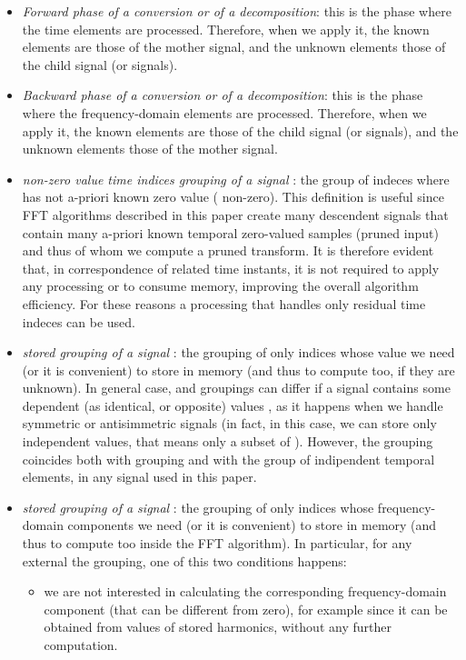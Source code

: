 \documentclass[a4paper,10pt]{article}
\begin{document}
\begin{itemize}
\item
\emph{Forward phase of a conversion or of a decomposition}:
this is the phase where the time elements are processed. Therefore, when we apply it, the known elements are those of the mother signal, and the unknown elements those of the child signal (or signals).


\item
\emph{Backward phase of a conversion or of a decomposition}:
this is the phase where the frequency-domain elements are processed. Therefore, when we apply it, the known elements are those of the child signal (or signals), and the unknown elements those of the mother signal.


\item
\emph{non-zero value time indices grouping  of a signal }:
the group of  indeces where  has not a-priori known zero value ( non-zero).
This definition is useful since FFT algorithms described in this paper create many descendent signals that contain many a-priori known temporal zero-valued samples (pruned input) and thus of whom we compute a pruned transform.
It is therefore evident that, in correspondence of related time instants, it is not required to apply any processing or to consume memory, improving the overall algorithm efficiency. 
For these reasons a processing that handles only residual time indeces can be used.


\item
\emph{stored  grouping of a signal }:
the grouping of only indices  whose  value we need (or it is convenient) to store in memory (and thus to compute too, if they are unknown).
In general case,  and  groupings can differ if a signal contains some dependent (as identical, or opposite) values , as it happens when we handle symmetric or antisimmetric signals (in fact, in this case, we can store only independent values, that means only a subset of ).
However, the  grouping coincides both with  grouping and with the group of indipendent temporal elements, in any signal used in this paper.


\item
\emph{stored  grouping of a signal }:
the grouping of only indices  whose frequency-domain components we need (or it is convenient) to store in memory (and thus to compute too inside the FFT algorithm).
In particular, for any  external the  grouping, one of this two conditions happens:
\begin{itemize}


\item 
we are not interested in calculating the corresponding frequency-domain component (that can be different from zero), for example since it can be obtained from  values of stored harmonics, without any further computation.
 


\end{itemize}
\end{itemize}
\end{document}
